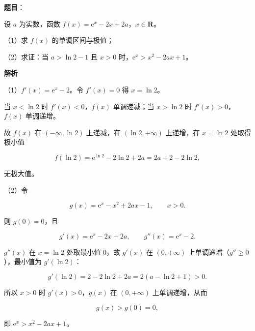 \begin{answer}

\textbf{题目}：

设 $a$ 为实数，函数 $f(x)=\mathrm e^x-2x+2a$，$x\in\mathbf R$。

（1）求 $f(x)$ 的单调区间与极值；

（2）求证：当 $a>\ln2-1$ 且 $x>0$ 时，$\mathrm e^x>x^2-2ax+1$。

\textbf{解析}

（1）$f'(x)=\mathrm e^x-2$。令 $f'(x)=0$ 得 $x=\ln2$。

当 $x<\ln2$ 时 $f'(x)<0$，$f(x)$ 单调递减；当 $x>\ln2$ 时 $f'(x)>0$，$f(x)$ 单调递增。

故 $f(x)$ 在 $(-\infty,\ln2)$ 上递减，在 $(\ln2,+\infty)$ 上递增，在 $x=\ln2$ 处取得极小值

\nopagebreak[4]
\[f(\ln2)=\mathrm e^{\ln2}-2\ln2+2a=2a+2-2\ln2,\]

无极大值。

（2）令

\nopagebreak[4]
\[g(x)=\mathrm e^x-x^2+2ax-1,\qquad x>0.\]

则 $g(0)=0$，且

\nopagebreak[4]
\[g'(x)=\mathrm e^x-2x+2a,\qquad g''(x)=\mathrm e^x-2.\]

$g''(x)$ 在 $x=\ln2$ 处取最小值 $0$，故 $g'(x)$ 在 $(0,+\infty)$ 上单调递增（$g''\geqslant0$），最小值为 $g'(\ln2)$：

\nopagebreak[4]
\[g'(\ln2)=2-2\ln2+2a=2(a-\ln2+1)>0.\]

所以 $x>0$ 时 $g'(x)>0$，$g(x)$ 在 $(0,+\infty)$ 上单调递增，从而

\nopagebreak[4]
\[g(x)>g(0)=0,\]

即 $\mathrm e^x>x^2-2ax+1$。


\end{answer}
